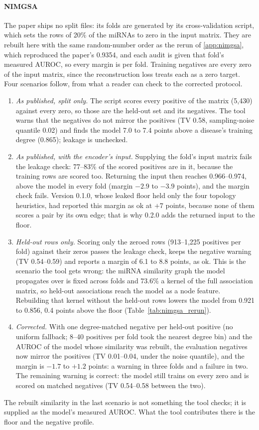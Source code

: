\documentclass[review]{elsarticle}
\begin{document}
\paragraph{NIMGSA} The paper ships no split files: its folds are generated by its cross-validation script,
which sets the rows of 20\% of the miRNAs to zero in the input matrix. They are rebuilt here with the same
random-number order as the rerun of \ref{app:nimgsa}, which reproduced the paper's 0.9354, and each
audit is given that fold's measured AUROC, so every margin is per fold. Training negatives are every zero of
the input matrix, since the reconstruction loss treats each as a zero target. Four scenarios follow, from what
a reader can check to the corrected protocol.
\begin{enumerate}
\item \emph{As published, split only.} The script scores every positive of the matrix (5,430) against every
zero, so those are the held-out set and its negatives. The tool warns that the negatives do not mirror the
positives (TV 0.58, sampling-noise quantile 0.02) and finds the model 7.0 to 7.4 points above a disease's
training degree (0.865); leakage is unchecked.
\item \emph{As published, with the encoder's input.} Supplying the fold's input matrix fails the leakage check:
77--83\% of the scored positives are in it, because the training rows are scored too. Returning the input
then reaches 0.966--0.974, above the model in every fold (margin $-2.9$ to $-3.9$ points), and the margin
check fails. Version 0.1.0, whose leaked floor held only the four topology heuristics, had reported this
margin as ok at $+7$ points, because none of them scores a pair by its own edge; that is why 0.2.0 adds the
returned input to the floor.
\item \emph{Held-out rows only.} Scoring only the zeroed rows (913--1,225 positives per fold) against their
zeros passes the leakage check, keeps the negative warning (TV 0.54--0.59) and reports a margin of 6.1 to
8.8 points, as ok. This is the scenario the tool gets wrong: the miRNA similarity graph the model propagates
over is fixed across folds and 73.6\% a kernel of the full association matrix, so held-out associations reach
the model as a node feature. Rebuilding that kernel without the held-out rows lowers the model from 0.921 to
0.856, 0.4 points above the floor (Table~\ref{tab:nimgsa_rerun}).
\item \emph{Corrected.} With one degree-matched negative per held-out positive (no uniform fallback; 8--40
positives per fold took the nearest degree bin) and the AUROC of the model whose similarity was rebuilt, the
evaluation negatives now mirror the positives (TV 0.01--0.04, under the noise quantile), and the margin is
$-1.7$ to $+1.2$ points: a warning in three folds and a failure in two. The remaining warning is correct: the
model still trains on every zero and is scored on matched negatives (TV 0.54--0.58 between the two).
\end{enumerate}
The rebuilt similarity in the last scenario is not something the tool checks; it is supplied as the model's
measured AUROC. What the tool contributes there is the floor and the negative profile.
\end{document}
